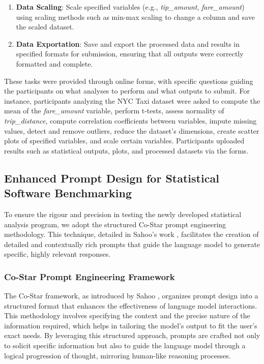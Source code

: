 \documentclass{article}
\begin{document}
\begin{enumerate}
    \item \textbf{Data Scaling}: Scale specified variables (e.g., \textit{tip\_amount}, \textit{fare\_amount}) using scaling methods such as min-max scaling to change a column and save the scaled dataset.

    \item \textbf{Data Exportation}: Save and export the processed data and results in specified formats for submission, ensuring that all outputs were correctly formatted and complete.
\end{enumerate}

These tasks were provided through online forms, with specific questions guiding the participants on what analyses to perform and what outputs to submit. For instance, participants analyzing the NYC Taxi dataset were asked to compute the mean of the \textit{fare\_amount} variable, perform t-tests, assess normality of \textit{trip\_distance}, compute correlation coefficients between variables, impute missing values, detect and remove outliers, reduce the dataset's dimensions, create scatter plots of specified variables, and scale certain variables. Participants uploaded results such as statistical outputs, plots, and processed datasets via the forms.

\subsection{Enhanced Prompt Design for Statistical Software Benchmarking}
To ensure the rigour and precision in testing the newly developed statistical analysis program, we adopt the structured Co-Star prompt engineering methodology. This technique, detailed in Sahoo's work \cite{Sahoo2023}, facilitates the creation of detailed and contextually rich prompts that guide the language model to generate specific, highly relevant responses.

\subsubsection{Co-Star Prompt Engineering Framework}
The Co-Star framework, as introduced by Sahoo \cite{Sahoo2023}, organizes prompt design into a structured format that enhances the effectiveness of language model interactions. This methodology involves specifying the context and the precise nature of the information required, which helps in tailoring the model's output to fit the user's exact needs. By leveraging this structured approach, prompts are crafted not only to solicit specific information but also to guide the language model through a logical progression of thought, mirroring human-like reasoning processes.
\end{document}
